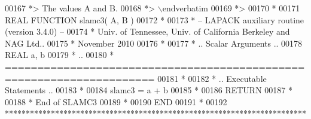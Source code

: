 \begin{DoxyCode}
00167 \textcolor{comment}{*>          The values A and B.}
00168 \textcolor{comment}{*> \(\backslash\)endverbatim}
00169 \textcolor{comment}{*>}
00170 \textcolor{comment}{*}
00171 \textcolor{keyword}{      REAL             }\textcolor{keyword}{FUNCTION }slamc3( A, B )
00172 \textcolor{comment}{*}
00173 \textcolor{comment}{*  -- LAPACK auxiliary routine (version 3.4.0) --}
00174 \textcolor{comment}{*     Univ. of Tennessee, Univ. of California Berkeley and NAG Ltd..}
00175 \textcolor{comment}{*     November 2010}
00176 \textcolor{comment}{*}
00177 \textcolor{comment}{*     .. Scalar Arguments ..}
00178       \textcolor{keywordtype}{REAL}               a, b
00179 \textcolor{comment}{*     ..}
00180 \textcolor{comment}{* =====================================================================}
00181 \textcolor{comment}{*}
00182 \textcolor{comment}{*     .. Executable Statements ..}
00183 \textcolor{comment}{*}
00184       slamc3 = a + b
00185 \textcolor{comment}{*}
00186       \textcolor{keywordflow}{RETURN}
00187 \textcolor{comment}{*}
00188 \textcolor{comment}{*     End of SLAMC3}
00189 \textcolor{comment}{*}
00190 \textcolor{keyword}{      END}
00191 \textcolor{comment}{*}
00192 \textcolor{comment}{************************************************************************}
\end{DoxyCode}
